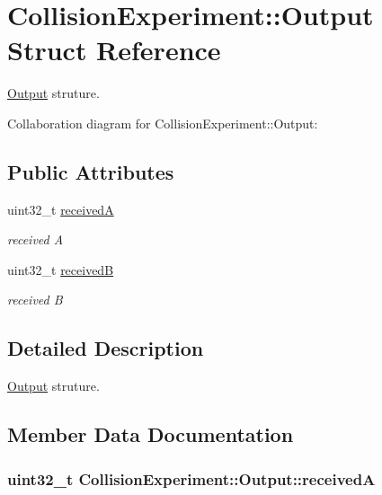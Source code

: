 \hypertarget{structCollisionExperiment_1_1Output}{}\section{Collision\+Experiment\+:\+:Output Struct Reference}
\label{structCollisionExperiment_1_1Output}


\hyperlink{structCollisionExperiment_1_1Output}{Output} struture.  




Collaboration diagram for Collision\+Experiment\+:\+:Output\+:
\subsection*{Public Attributes}
\begin{DoxyCompactItemize}
\item 
uint32\+\_\+t \hyperlink{structCollisionExperiment_1_1Output_abdbc46d25da786a5bd465bbbae9fb811}{receivedA}
\begin{DoxyCompactList}\small\item\em received A \end{DoxyCompactList}\item 
uint32\+\_\+t \hyperlink{structCollisionExperiment_1_1Output_aecf9ff6b62ec5f8511a82052ed182353}{receivedB}
\begin{DoxyCompactList}\small\item\em received B \end{DoxyCompactList}\end{DoxyCompactItemize}


\subsection{Detailed Description}
\hyperlink{structCollisionExperiment_1_1Output}{Output} struture. 

\subsection{Member Data Documentation}
\subsubsection[{\texorpdfstring{receivedA}{receivedA}}]{\setlength{\rightskip}{0pt plus 5cm}uint32\+\_\+t Collision\+Experiment\+::\+Output\+::receivedA}\hypertarget{structCollisionExperiment_1_1Output_abdbc46d25da786a5bd465bbbae9fb811}{}\label{structCollisionExperiment_1_1Output_abdbc46d25da786a5bd465bbbae9fb811}


